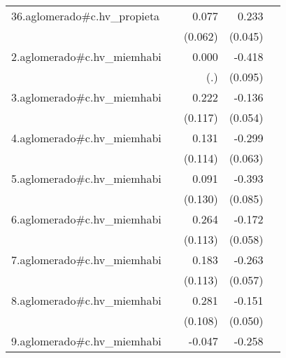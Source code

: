 {\begin{longtable}{l*{4}{D{.}{.}{-1}}}
\addlinespace
36.aglomerado#c.hv\_propieta&                     &       0.077         &       0.233\sym{***}&                     \\
            &                     &     (0.062)         &     (0.045)         &                     \\
\addlinespace
2.aglomerado#c.hv\_miemhabi&                     &       0.000         &      -0.418\sym{***}&                     \\
            &                     &         (.)         &     (0.095)         &                     \\
\addlinespace
3.aglomerado#c.hv\_miemhabi&                     &       0.222         &      -0.136\sym{*}  &                     \\
            &                     &     (0.117)         &     (0.054)         &                     \\
\addlinespace
4.aglomerado#c.hv\_miemhabi&                     &       0.131         &      -0.299\sym{***}&                     \\
            &                     &     (0.114)         &     (0.063)         &                     \\
\addlinespace
5.aglomerado#c.hv\_miemhabi&                     &       0.091         &      -0.393\sym{***}&                     \\
            &                     &     (0.130)         &     (0.085)         &                     \\
\addlinespace
6.aglomerado#c.hv\_miemhabi&                     &       0.264\sym{*}  &      -0.172\sym{**} &                     \\
            &                     &     (0.113)         &     (0.058)         &                     \\
\addlinespace
7.aglomerado#c.hv\_miemhabi&                     &       0.183         &      -0.263\sym{***}&                     \\
            &                     &     (0.113)         &     (0.057)         &                     \\
\addlinespace
8.aglomerado#c.hv\_miemhabi&                     &       0.281\sym{**} &      -0.151\sym{**} &                     \\
            &                     &     (0.108)         &     (0.050)         &                     \\
\addlinespace
9.aglomerado#c.hv\_miemhabi&                     &      -0.047         &      -0.258\sym{***}&                     \\

\end{longtable}}
